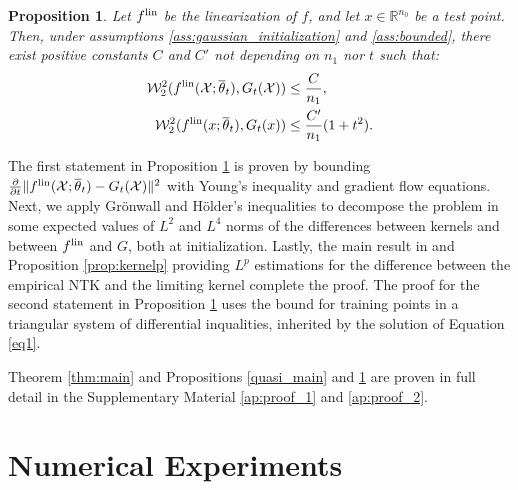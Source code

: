 \documentclass{article}
\newtheorem{prop}[thm]{Proposition}
\theoremstyle{definition}
\theoremstyle{remark}
\numberwithin{equation}{section}
\newcommand{\X}{\mathcal{X}}
\newcommand{\R}{\mathbb{R}}
\newcommand{\lin}{{\textup{lin}}}
\newcommand{\lammin}{\lambda_{\textup{min}}}
\newcommand{\norm}[2]{
    \|#1\|_{#2}
}
\begin{document}
\begin{prop}
    \label{prop:main_linear}
    Let $f^\lin$ be the linearization of $f$, and let $x\in \R^{n_0}$ be a test point.
    Then, under assumptions \ref{ass:gaussian_initialization} and \ref{ass:bounded}, there exist positive constants 
    $C$ and $C'$
    not depending on $n_1$ nor $t$ such that:
    \begin{align*}
        \mathcal W_2^2(f^\lin(\X;\overline \theta_t),G_t(\X)) &\le \frac{C}{n_1},\\
        \mathcal W_2^2(f^\lin(x;\overline \theta_t),G_t(x)) &\le \frac{C'}{n_1}(1+t^2).
    \end{align*}
    \end{prop}
    
    The first statement in Proposition \ref{prop:main_linear} is proven by bounding $\frac{\partial}{\partial t}\norm{f^\lin(\X;\overline \theta_t) - G_t(\X)}{}^2$ with Young's inequality and gradient flow equations.
    Next, we apply Grönwall and Hölder's inequalities to decompose the problem in some expected values of $L^2$ and $L^4$ norms of the differences between kernels and between $f^\lin$ and $G$, both at initialization.
    Lastly, the main result in \cite{BasteriTrevisan2023} and Proposition \ref{prop:kernelp} providing $L^p$ estimations for the difference between the empirical NTK and the limiting kernel complete the proof.   
    The proof for the second statement in Proposition \ref{prop:main_linear} uses the bound for training points in a triangular system of differential inqualities, inherited by the solution of Equation \eqref{eq1}.
    
Theorem \ref{thm:main} and Propositions \ref{quasi_main} and \ref{prop:main_linear} are proven in full detail in the Supplementary Material \ref{ap:proof_1} and \ref{ap:proof_2}.

\section{Numerical Experiments}
\label{sec:experiments}
\end{document}
